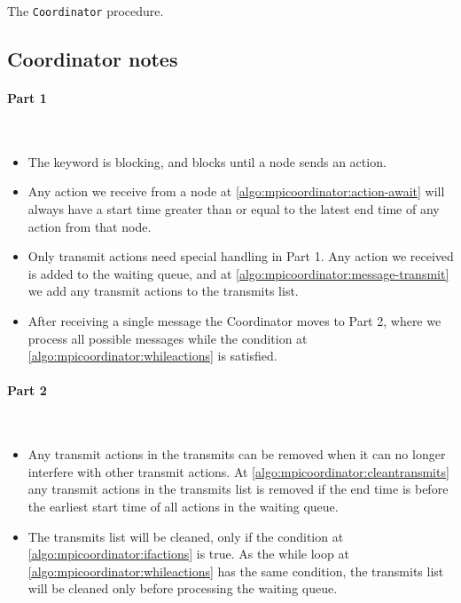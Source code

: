 \begin{algorithm}[H]
{{{                
            }
        }
    }
    \caption{The \texttt{Coordinator} procedure.}
    \label{algo:mpicoordinator}
\end{algorithm}

\clearpage

\subsection{Coordinator notes}
\paragraph{Part 1} \

\begin{itemize}
    \item The \KwAwait keyword is blocking, and blocks until a node sends an action.
    \item Any action we receive from a node at \autoref{algo:mpicoordinator:action-await} will always have a start time greater than or equal to the latest end time of any action from that node.
    \item Only transmit actions need special handling in Part 1. Any action we received is added to the waiting queue, and at \autoref{algo:mpicoordinator:message-transmit} we add any transmit actions to the transmits list.
    \item After receiving a single message the Coordinator moves to Part 2, where we process all possible messages while the condition at \autoref{algo:mpicoordinator:whileactions} is satisfied.
\end{itemize}

\paragraph{Part 2} \

\begin{itemize}
    \item Any transmit actions in the transmits can be removed when it can no longer interfere with other transmit actions. At \autoref{algo:mpicoordinator:cleantransmits} any transmit actions in the transmits list is removed if the end time is before the earliest start time of all actions in the waiting queue.
    \item The transmits list will be cleaned, only if the condition at \autoref{algo:mpicoordinator:ifactions} is true. As the while loop at \autoref{algo:mpicoordinator:whileactions} has the same condition, the transmits list will be cleaned only before processing the waiting queue.
\end{itemize}

